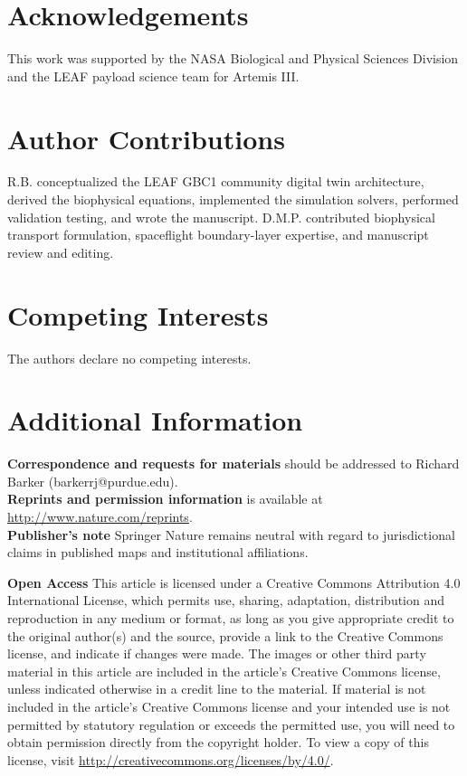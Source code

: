 \documentclass[10pt,twocolumn,twoside]{article}
\begin{document}
\section*{Acknowledgements}
This work was supported by the NASA Biological and Physical Sciences Division and the LEAF payload science team for Artemis III.

\section*{Author Contributions}
R.B. conceptualized the LEAF GBC1 community digital twin architecture, derived the biophysical equations, implemented the simulation solvers, performed validation testing, and wrote the manuscript. D.M.P. contributed biophysical transport formulation, spaceflight boundary-layer expertise, and manuscript review and editing.

\section*{Competing Interests}
The authors declare no competing interests.

\section*{Additional Information}
\noindent\textbf{Correspondence and requests for materials} should be addressed to Richard Barker (barkerrj@purdue.edu).\\[4pt]
\noindent\textbf{Reprints and permission information} is available at \url{http://www.nature.com/reprints}.\\[4pt]
\noindent\textbf{Publisher's note} Springer Nature remains neutral with regard to jurisdictional claims in published maps and institutional affiliations.

\vspace{10pt}
\begin{tcolorbox}[colback=boxgray,colframe=gray!40,arc=1.5mm,boxrule=0.5pt,left=6pt,right=6pt,top=6pt,bottom=6pt]
\fontsize{7.5bp}{9.5bp}\selectfont\sffamily
\textbf{Open Access} This article is licensed under a Creative Commons Attribution 4.0 International License, which permits use, sharing, adaptation, distribution and reproduction in any medium or format, as long as you give appropriate credit to the original author(s) and the source, provide a link to the Creative Commons license, and indicate if changes were made. The images or other third party material in this article are included in the article’s Creative Commons license, unless indicated otherwise in a credit line to the material. If material is not included in the article’s Creative Commons license and your intended use is not permitted by statutory regulation or exceeds the permitted use, you will need to obtain permission directly from the copyright holder. To view a copy of this license, visit \url{http://creativecommons.org/licenses/by/4.0/}.
\end{tcolorbox}



\end{document}
